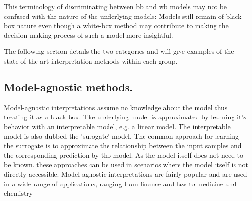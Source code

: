 This terminology of discriminating between bb and wb models may not be confused with the nature of the underlying models: Models still remain of black-box nature even though a white-box method may contribute to making the decision making process of such a model more insightful. %


The following section details the two categories and will give examples of the state-of-the-art interpretation methods within each group. 





\subsection{Model-agnostic methods.}
\label{subsec:bb_methods}

Model-agnostic interpretations assume no knowledge about the model thus treating it as a black box. The underlying model is approximated by learning it's behavior with an interpretable model, e.g. a linear model. The interpretable model is also dubbed the 'surogate' model. The common approach for learning the surrogate is to approximate the relationship between the input samples and the corresponding prediction by tho model.
As the model itself does not need to be known, these approaches can be used in scenarios where the model itself is not directly accessible. Model-agnostic interpretations are fairly popular and are used in a wide range of applications, ranging from finance and law to medicine and chemistry \cite{elshawi2019interpretability, whitmore2016mapping}. 

